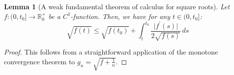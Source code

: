 \documentclass[11pt,leqno,textwidth=10cm]{amsart}
\numberwithin{equation}{section}
\theoremstyle{definition}
\theoremstyle{plain}
\newtheorem{lemma}[definition]{Lemma}
\newcommand{\1}{\mathbbm{1}}
\newcommand{\N}{\mathbb{N}}
\newcommand{\R}{\mathbb{R}}
\begin{document}
\begin{lemma}[A weak fundamental theorem of calculus for square roots]\label{lem:weak-ftoc}
Let $f:(0,t_0]\longrightarrow\R^+_0$ be a $C^1$-function. Then, we have for any $t\in(0,t_0]$:
\begin{equation}\label{eq:weak-ftoc}
\sqrt{f(t)}\leq \sqrt{f(t_0)}+\int_t^{t_0}\frac{\lvert f^\prime(s)\rvert}{2\sqrt{f(s)}}\,ds
\end{equation}
\end{lemma}
\begin{proof} This follows from a straightforward application of the monotone convergence theorem to $g_n=\sqrt{f+\frac1n}$.
\end{proof}
\end{document}
